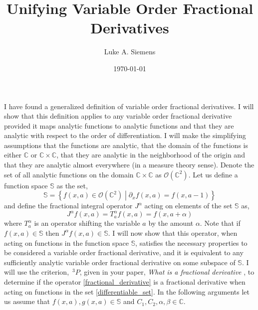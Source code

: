 \documentclass[%
 onecolumn,
 amsmath, amssymb, aps, pra, 10pt
]{revtex4-2}
\begin{document}
\title{Unifying Variable Order Fractional Derivatives}%
\author{Luke A. Siemens}
\noaffiliation
\date{\today}
\maketitle

I have found a generalized definition of variable order fractional derivatives. I will show that this definition applies to any variable order fractional derivative provided it maps analytic functions to analytic functions and that they are analytic with respect to the order of differentiation. I will make the simplifying assumptions that the functions are analytic, that the domain of the functions is either $\mathbb{C}$ or $\mathbb{C} \times \mathbb{C}$, that they are analytic in the neighborhood of the origin and that they are analytic almost everywhere (in a measure theory sense). Denote the set of all analytic functions on the domain $\mathbb{C} \times \mathbb{C}$ as $\mathcal{O}(\mathbb{C}^2)$. Let us define a function space $\mathbb{S}$ as the set,
\begin{equation}
\mathbb{S} = \left\lbrace f(x, a) \in \mathcal{O}(\mathbb{C}^2) \middle| \partial_x f(x, a) = f(x, a - 1) \right\rbrace
\label{differentiable_set}
\end{equation}
and define the fractional integral operator $J^{\alpha}$ acting on elements of the set $\mathbb{S}$ as,
\begin{equation}
J^{\alpha} f(x, a) = T_{a}^{\alpha} f(x, a) = f(x, a + \alpha)
\label{fractional_derivative}
\end{equation}
where $T_{a}^{\alpha}$ is an operator shifting the variable $a$ by the amount $\alpha$. Note that if $f(x, a) \in \mathbb{S}$ then $J^{\alpha} f(x, a) \in \mathbb{S}$. I will now show that this operator, when acting on functions in the function space $\mathbb{S}$, satisfies the necessary properties to be considered a variable order fractional derivative, and it is equivalent to any sufficiently analytic variable order fractional derivative on some subspace of $\mathbb{S}$.
I will use the criterion, $\,^3P$, given in your paper, \textit{What is a fractional derivative} \cite{ORTIGUEIRA20154}, to determine if the operator \eqref{fractional_derivative} is a fractional derivative when acting on functions in the set \eqref{differentiable_set}. In the following arguments let us assume that $f(x, a), g(x, a) \in \mathbb{S}$ and $C_1, C_2, \alpha, \beta \in \mathbb{C}$.
\end{document}
